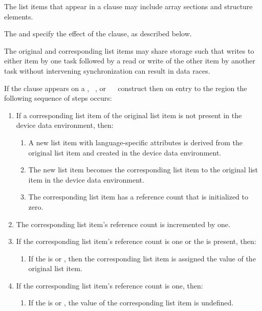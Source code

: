 \descr
The list items that appear in a  clause may include array sections and structure elements.

The  and  specify the effect of the  clause, as described below.

The original and corresponding list items may share storage such that writes to either
item by one task followed by a read or write of the other item by another task without
intervening synchronization can result in data races.

If the  clause appears on a , ~, or ~~ construct then on entry to the region the following sequence of steps occurs:
\begin{enumerate}
\item If a corresponding list item of the original list item is not present in the device data environment, then:
\begin{enumerate}
\item A new list item with language-specific attributes is derived from the original list item and created in the device data environment.
\item The new list item becomes the corresponding list item to the original list item in the device data environment.
\item The corresponding list item has a reference count that is initialized to zero. 
\end{enumerate}
\item The corresponding list item's reference count is incremented by one.
\item If the corresponding list item's reference count is one or the   is present, then:
\begin{enumerate}
\item If the  is  or , then the corresponding list item is assigned the value of the original list item. 
\end{enumerate}
\item If the corresponding list item's reference count is one, then:
\begin{enumerate}
\item If the  is  or , the value of the corresponding list item is undefined. 
\end{enumerate}
\end{enumerate}


